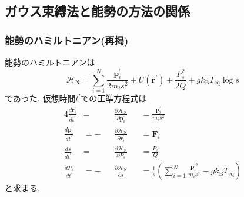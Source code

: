 \subsection{ガウス束縛法と能勢の方法の関係}
\subsubsection{能勢のハミルトニアン(再掲)}
能勢のハミルトニアンは
\begin{equation}
    \mathcal{H}_{\mathrm{N}}
    =
    \sum_{i=1}^{N}
    \frac{\bm{p}_{i}^{\prime}}{2m_{i}s^{2}}
    +
    U(\bm{r}^{\prime})
    +
    \frac{P_{s}^{2}}{2Q}
    +
    g k_{\mathrm{B}} T_{\mathrm{eq}} \log s
    \label{Eq:Gauss-NoseHamiltonian}
\end{equation}
であった. 仮想時間$t^{\prime}$での正準方程式は
\begin{alignat}{4}
    \frac{d \bm{r}_{i}^{\prime}} {dt^{\prime}}
    &=&&
    \frac{\partial \mathcal{H}_{\mathrm{N}}}{\partial \bm{p}_{i}^{\prime}}
    &&=
    \frac{\bm{p}_{i}^{\prime}}{m_{i}s^{2}}
    \\
    \frac{d \bm{p}_{i}^{\prime}} {dt^{\prime}}
    &=-&&
    \frac{\partial \mathcal{H}_{\mathrm{N}}}{\partial \bm{r}_{i}^{\prime}}
    &&=
    \bm{F}_{i}
    \\
    \frac{d s} {dt^{\prime}}
    &= &&
    \frac{\partial \mathcal{H}_{\mathrm{N}}}{\partial P_{s}}
    &&=
    \frac{P_{s}}{Q}
    \\
    \frac{d P_{s}} {dt^{\prime}}
    &= -&&
    \frac{\partial \mathcal{H}_{\mathrm{N}}}{\partial s}
    &&=
    \frac{1}{s}
    \left(
        \sum_{i=1}^{N}
        \frac{\bm{p}_{i}^{\prime2}}{m_{i}s^{2}}
        -
        g k_{\mathrm{B}} T_{\mathrm{eq}}
    \right)
\end{alignat}
と求まる.

